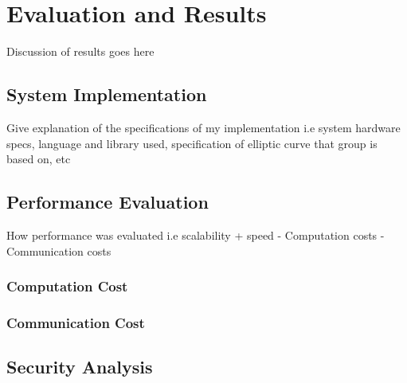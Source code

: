 \chapter{Evaluation and Results}
\label{chap:evaluation_and_results}

Discussion of results goes here

\section{System Implementation}

Give explanation of the specifications of my implementation i.e system hardware specs, language and library used, specification of elliptic curve that group is based on, etc


\section{Performance Evaluation}

How performance was evaluated i.e scalability + speed
- Computation costs
- Communication costs

\subsection*{Computation Cost}


\subsection*{Communication Cost}


\section{Security Analysis}
%
%
%
%
%
